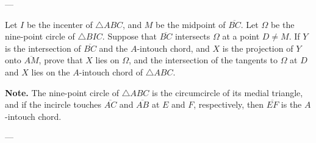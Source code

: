 
---

Let $I$ be the incenter of $\triangle ABC$, and $M$ be the midpoint of $\overline{BC}$. Let $\Omega$ be the nine-point circle of $\triangle BIC$. Suppose that $\overline{BC}$ intersects $\Omega$ at a point $D\ne M$. If $Y$ is the intersection of $\overline{BC}$ and the $A$-intouch chord, and $X$ is the projection of $Y$ onto $\overline{AM}$, prove that $X$ lies on $\Omega$, and the intersection of the tangents to $\Omega$ at $D$ and $X$ lies on the $A$-intouch chord of $\triangle ABC$.

\noindent
\textbf{Note.} The nine-point circle of $\triangle ABC$ is the circumcircle of its medial triangle, and if the incircle touches $\overline{AC}$ and $\overline{AB}$ at $E$ and $F$, respectively, then $\overline{EF}$ is the $A$-intouch chord.

---

